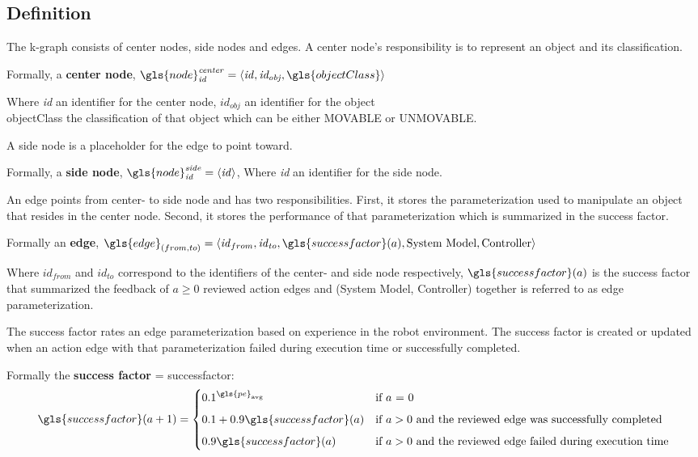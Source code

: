 \subsection{Definition}%
\label{subsec:k-graph_definition}
The \ac{k-graph} consists of center nodes, side nodes and edges. A center node's responsibility is to represent an object and its classification.\bs

Formally, a \textbf{center node}, $\gls{node}^{\mathit{center}}_\mathit{id} =\left\langle \mathit{id}, \mathit{id_{obj}}, \gls{objectClass} \right\rangle $\bs

Where \textit{id} an identifier for the center node, $\mathit{id_{obj}}$ an identifier for the object\\\gls{objectClass} the classification of that object which can be either MOVABLE or UNMOVABLE.\bs

\noindent A side node is a placeholder for the edge to point toward.\bs

Formally, a \textbf{side node}, $\gls{node}^{\mathit{side}}_\mathit{id} =\left\langle \mathit{id} \right\rangle $, Where \textit{id} an identifier for the side node.\bs

\noindent An edge points from center- to side node and has two responsibilities. First, it stores the parameterization used to manipulate an object that resides in the center node. Second, it stores the performance of that parameterization which is summarized in the success factor.\bs

Formally an \textbf{edge}, $\gls{edge}_{(from, to)} = \left\langle \mathit{id}_{from}, \mathit{id}_{to}, \gls{successfactor}(a), \textrm{System Model}, \textrm{Controller}\right\rangle$\bs

Where $\mathit{id}_\mathit{from}$ and $\mathit{id}_\mathit{to}$ correspond to the identifiers of the center- and side node respectively, $\gls{successfactor}(a)$ is the success factor that summarized the feedback of $a\geq0$ reviewed action edges and (System Model, Controller) together is referred to as edge parameterization. \bs

The success factor rates an edge parameterization based on experience in the robot environment. The success factor is created or updated when an action edge with that parameterization failed during execution time or successfully completed.\bs

Formally the \textbf{success factor} = \gls{successfactor}:
\begin{equation}
\gls{successfactor}(a+1) =
  \begin{cases} 0.1^{\gls{pe}_\textrm{avg}}& \textrm{if $a$ = 0}\\[5px]
    0.1 + 0.9\gls{successfactor}(a) & \textrm{if $a > 0$ and the reviewed edge was successfully completed}\\[5px]
  0.9\gls{successfactor}(a) & \textrm{if $a > 0$ and the reviewed edge failed during execution time}
\end{cases}
\label{eq:success_factor}
\end{equation}

